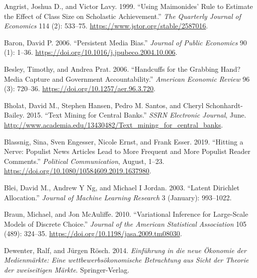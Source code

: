 \documentclass[
  12pt,
]{article}
\newlength{\cslhangindent}
\newlength{\cslentryspacingunit} %
\newenvironment{CSLReferences}[2] %
 {%
  \setlength{\parindent}{0pt}
  \ifodd #1
  \let\oldpar\par
  \def\par{\hangindent=\cslhangindent\oldpar}
  \fi
  \setlength{\parskip}{#2\cslentryspacingunit}
 }%
 {}
\begin{document}
\hypertarget{refs}{}
\begin{CSLReferences}{1}{0}
\leavevmode{}%
Angrist, Joshua D., and Victor Lavy. 1999. {``Using Maimonides' Rule to
Estimate the Effect of Class Size on Scholastic Achievement.''}
\emph{The Quarterly Journal of Economics} 114 (2): 533--75.
\url{https://www.jstor.org/stable/2587016}.

\leavevmode{}%
Baron, David P. 2006. {``Persistent Media Bias.''} \emph{Journal of
Public Economics} 90 (1): 1--36.
\url{https://doi.org/10.1016/j.jpubeco.2004.10.006}.

\leavevmode{}%
Besley, Timothy, and Andrea Prat. 2006. {``Handcuffs for the Grabbing
Hand? Media Capture and Government Accountability.''} \emph{American
Economic Review} 96 (3): 720--36.
\url{https://doi.org/10.1257/aer.96.3.720}.

\leavevmode{}%
Bholat, David M., Stephen Hansen, Pedro M. Santos, and Cheryl
Schonhardt-Bailey. 2015. {``Text Mining for Central Banks.''}
\emph{{SSRN} Electronic Journal}, June.
\url{http://www.academia.edu/13430482/Text_mining_for_central_banks}.

\leavevmode{}%
Blassnig, Sina, Sven Engesser, Nicole Ernst, and Frank Esser. 2019.
{``Hitting a Nerve: Populist News Articles Lead to More Frequent and
More Populist Reader Comments.''} \emph{Political Communication},
August, 1--23. \url{https://doi.org/10.1080/10584609.2019.1637980}.

\leavevmode{}%
Blei, David M., Andrew Y Ng, and Michael I Jordan. 2003. {``Latent
Dirichlet Allocation.''} \emph{Journal of Machine Learning Research} 3
(January): 993--1022.

\leavevmode{}%
Braun, Michael, and Jon McAuliffe. 2010. {``Variational Inference for
Large-Scale Models of Discrete Choice.''} \emph{Journal of the American
Statistical Association} 105 (489): 324--35.
\url{https://doi.org/10.1198/jasa.2009.tm08030}.

\leavevmode{}%
Dewenter, Ralf, and Jürgen Rösch. 2014. \emph{Einführung in die neue
Ökonomie der Medienmärkte: Eine wettbewerbsökonomische Betrachtung aus
Sicht der Theorie der zweiseitigen Märkte}. Springer-Verlag.


\end{CSLReferences}
\end{document}
